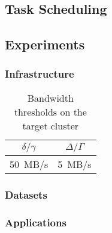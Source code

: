 \documentclass{IEEEtran}
\begin{document}


\subsection{Task Scheduling}


\subsection{Experiments} %

\subsubsection{Infrastructure} %


\begin{table}
\centering
\begin{tabular}{c|c}
$\delta/\gamma$ & $\Delta/\Gamma$\\
\hline
50~MB/s         & 5~MB/s
\end{tabular}
\label{table:infrastructure}
\caption{Bandwidth thresholds on the target cluster}
\end{table}


\subsubsection{Datasets} %


\subsubsection{Applications} %





\end{document}
